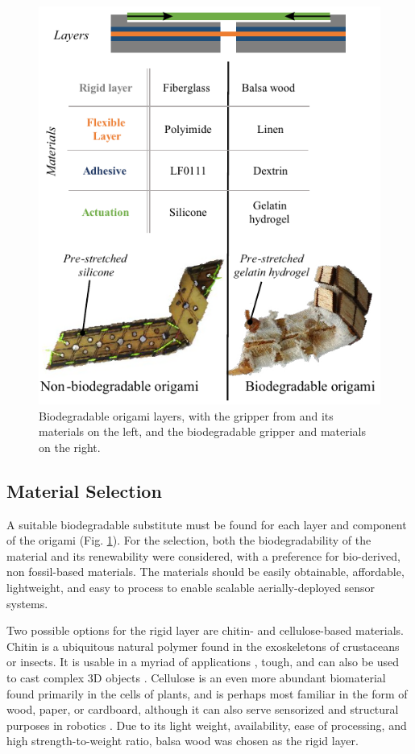 \begin{figure}[!t]
\centering
\includegraphics[width=1\columnwidth]{figures/figure2-biodegrad-layers/figure2-biodegrad-layers.pdf}
\caption{Biodegradable origami layers, with the gripper from \cite{Geckeler2022a} and its materials on the left, and the biodegradable gripper and materials on the right.}
\label{fig2_biodegrad_layers}
\end{figure}

\subsection{Material Selection}
A suitable biodegradable substitute must be found for each layer and component of the origami (Fig. \ref{fig2_biodegrad_layers}). For the selection, both the biodegradability of the material and its renewability were considered, with a preference for bio-derived, non fossil-based materials. The materials should be easily obtainable, affordable, lightweight, and easy to process to enable scalable aerially-deployed sensor systems.

Two possible options for the rigid layer are chitin- and cellulose-based materials. Chitin is a ubiquitous natural polymer found in the exoskeletons of crustaceans or insects. It is usable in a myriad of applications \cite{Elieh-Ali-Komi2016}, tough, and can also be used to cast complex 3D objects  \cite{Fernandez2014}.
Cellulose is an even more abundant biomaterial found primarily in the cells of plants, and is perhaps most familiar in the form of wood, paper, or cardboard, although it can also serve sensorized and structural purposes in robotics \cite{Wiesemuller2021Self-sensingStiffness, Mazzeo2021}. Due to its light weight, availability, ease of processing, and high strength-to-weight ratio, balsa wood was chosen as the rigid layer.

